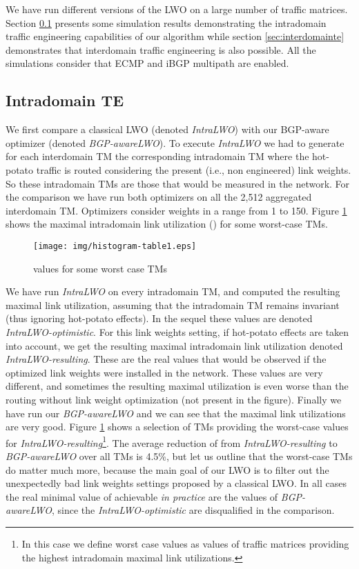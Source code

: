 \documentclass{acm_proc_article-sp}
\begin{document}
We have run different versions of the LWO on a large
number of traffic matrices. Section \ref{sec:intradomainte} presents
some simulation results demonstrating the intradomain traffic
engineering capabilities of our algorithm while section
\ref{sec:interdomainte} demonstrates that interdomain traffic
engineering is also possible. All the simulations consider that ECMP and
iBGP multipath are enabled.

\subsection{Intradomain TE}
\label{sec:intradomainte}

We first compare a classical LWO (denoted \textit{IntraLWO}) with
our BGP-aware optimizer (denoted \textit{BGP-awareLWO}). 
To execute \textit{IntraLWO} we had to generate for each interdomain TM the
corresponding intradomain TM where
the hot-potato traffic is routed considering the present (i.e., non engineered) link
weights. So these intradomain TMs
are those that would be measured in the network.
For the comparison we have run both
optimizers on all the 2,512 aggregated
interdomain TM. Optimizers consider weights in a range from 1 to 150.
Figure \ref{tab:resultumax} shows the maximal intradomain link
utilization () for some worst-case TMs. 

\begin{figure}[htbp]
  \centering
  \texttt{[image: img/histogram-table1.eps]}
  \caption{ values for some worst case TMs}
  \label{tab:resultumax}
\end{figure}

We have run \textit{IntraLWO} on every intradomain TM, and computed the 
resulting maximal link utilization, assuming that the intradomain TM remains invariant 
(thus ignoring hot-potato effects). In the sequel these values are denoted
\textit{IntraLWO-optimistic}. For this link weights setting, if
hot-potato effects are taken into account, we get
the resulting maximal intradomain link utilization denoted
\textit{IntraLWO-resulting}. These are the real values that would be
observed if the optimized link weights were installed in the network. 
These values are very different, and sometimes the resulting maximal utilization
is even worse than the routing without link weight optimization (not present in the
figure). Finally we have run our \textit{BGP-awareLWO}
and we can see that the maximal link utilizations are very good. 
Figure \ref{tab:resultumax} shows a selection of TMs providing
the worst-case values for \textit{IntraLWO-resulting}\footnote{
    In this case we define worst case values as values of traffic matrices providing the highest
    intradomain maximal link utilizations.}. The average reduction of 
from \textit{IntraLWO-resulting} to \textit{BGP-awareLWO} over all TMs
is 4.5\%, but let us outline that the worst-case TMs do matter much more, because
the main goal of our LWO is to filter out the unexpectedly bad link weights settings proposed
by a classical LWO.
In all cases the real minimal value of 
achievable \textit{in practice} are the values of \textit{BGP-awareLWO}, since
the \textit{IntraLWO-optimistic} are disqualified in the comparison.
\end{document}
